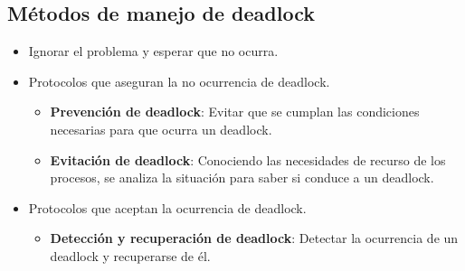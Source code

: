 \documentclass{templateNote}
\begin{document}
\subsection*{Métodos de manejo de deadlock}
\begin{itemize}
    \item Ignorar el problema y esperar que no ocurra.
    \item Protocolos que aseguran la no ocurrencia de deadlock.
    \begin{itemize}
        \item \textbf{Prevención de deadlock}: Evitar que se cumplan las condiciones necesarias para que ocurra un deadlock.
        \item \textbf{Evitación de deadlock}: Conociendo las necesidades de recurso de los procesos, se analiza la situación para saber si conduce a un deadlock.
    \end{itemize}
    \item Protocolos que aceptan la ocurrencia de deadlock.
    \begin{itemize}
        \item \textbf{Detección y recuperación de deadlock}: Detectar la ocurrencia de un deadlock y recuperarse de él.
    \end{itemize}
\end{itemize}
\end{document}
